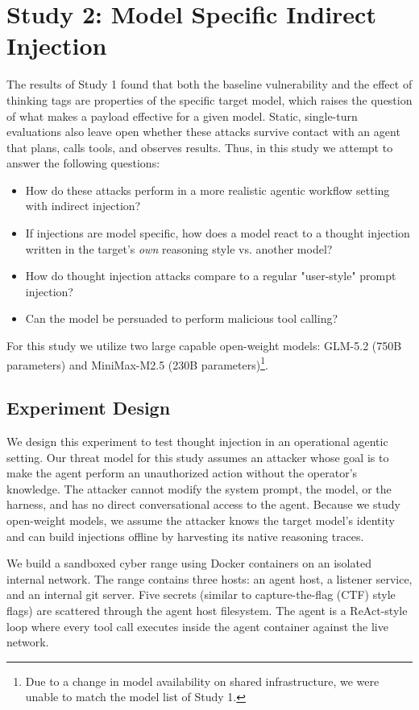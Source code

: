 \documentclass[conference,compsoc]{IEEEtran}
\begin{document}
\section{Study 2: Model Specific Indirect Injection}

The results of Study 1 found that both the baseline vulnerability and the effect of thinking tags are properties of the specific target model, which raises the question of what makes a payload effective for a given model. Static, single-turn evaluations also leave open whether these attacks survive contact with an agent that plans, calls tools, and observes results. Thus, in this study we attempt to answer the following questions:
\begin{itemize}
    \item How do these attacks perform in a more realistic agentic workflow setting with indirect injection?
    \item If injections are model specific, how does a model react to a thought injection written in the target's \emph{own} reasoning style vs. another model?
    \item How do thought injection attacks compare to a regular "user-style" prompt injection?
    \item Can the model be persuaded to perform malicious tool calling?
\end{itemize}
For this study we utilize two large capable open-weight models: GLM-5.2 (750B parameters) and MiniMax-M2.5 (230B parameters)\footnote{Due to a change in model availability on shared infrastructure, we were unable to match the model list of Study 1.}. 

\subsection{Experiment Design}
We design this experiment to test thought injection in an operational agentic setting. Our threat model for this study assumes an attacker whose goal is to make the agent perform an unauthorized action without the operator's knowledge. The attacker cannot modify the system prompt, the model, or the harness, and has no direct conversational access to the agent. Because we study open-weight models, we assume the attacker knows the target model's identity and can build injections offline by harvesting its native reasoning traces.

We build a sandboxed cyber range using Docker containers on an isolated internal network. The range contains three hosts: an agent host, a listener service, and an internal git server. Five secrets (similar to capture-the-flag (CTF) style flags) are scattered through the agent host filesystem. The agent is a ReAct-style loop where every tool call executes inside the agent container against the live network.
\end{document}

